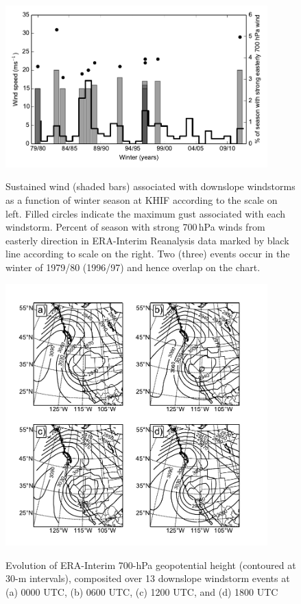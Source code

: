 \documentclass[pdftex,12pt]{article}
\begin{document}
\begin{figure}[t]
\centering
\includegraphics[width=0.9\textwidth]{climoplot.pdf}\\
\caption{Sustained wind (shaded bars) associated with downslope windstorms as a function of winter season at KHIF according to the scale on left. Filled circles indicate the maximum gust associated with each windstorm. Percent of season with strong 700\,hPa winds from easterly direction in ERA-Interim Reanalysis data marked by black line according to scale on the right. Two (three) events occur in the winter of 1979/80 (1996/97) and hence overlap on the chart.}
\label{fig:climoplot}
\end{figure}

\begin{figure}[t]
\centering
\includegraphics[width=0.9\textwidth]{composite_700hPa_Z.pdf}\\
\caption{Evolution of ERA-Interim 700-hPa geopotential height (contoured at 30-m intervals), composited over 13 downslope windstorm events at (a) 0000 UTC, (b) 0600 UTC, (c) 1200 UTC, and (d) 1800 UTC}
\label{fig:700comp}
\end{figure}
\end{document}

